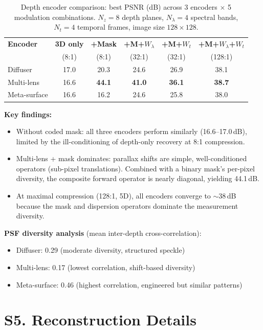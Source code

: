 \documentclass[11pt,a4paper]{article}
\begin{document}
\begin{table}[htbp]
\centering
\caption{Depth encoder comparison: best PSNR (dB) across 3 encoders $\times$ 5 modulation combinations.  $N_z{=}8$ depth planes, $N_\lambda{=}4$ spectral bands, $N_t{=}4$ temporal frames, image size $128{\times}128$.}
\small
\begin{tabular}{@{}lccccc@{}}
\toprule
\textbf{Encoder} & \textbf{3D only} & \textbf{+Mask} & \textbf{+M+$W_\lambda$} & \textbf{+M+$W_t$} & \textbf{+M+$W_\lambda$+$W_t$} \\
& (8:1) & (8:1) & (32:1) & (32:1) & (128:1) \\
\midrule
Diffuser & 17.0 & 20.3 & 24.6 & 26.9 & 38.1 \\
Multi-lens & 16.6 & \textbf{44.1} & \textbf{41.0} & \textbf{36.1} & \textbf{38.7} \\
Meta-surface & 16.6 & 16.2 & 24.6 & 25.8 & 38.0 \\
\bottomrule
\end{tabular}
\end{table}

\textbf{Key findings:}
\begin{itemize}[nosep]
\item Without coded mask: all three encoders perform similarly (16.6--17.0\,dB), limited by the ill-conditioning of depth-only recovery at 8:1 compression.
\item Multi-lens + mask dominates: parallax shifts are simple, well-conditioned operators (sub-pixel translations).  Combined with a binary mask's per-pixel diversity, the composite forward operator is nearly diagonal, yielding 44.1\,dB.
\item At maximal compression (128:1, 5D), all encoders converge to ${\sim}$38\,dB because the mask and dispersion operators dominate the measurement diversity.
\end{itemize}

\textbf{PSF diversity analysis} (mean inter-depth cross-correlation):
\begin{itemize}[nosep]
\item Diffuser: 0.29 (moderate diversity, structured speckle)
\item Multi-lens: 0.17 (lowest correlation, shift-based diversity)
\item Meta-surface: 0.46 (highest correlation, engineered but similar patterns)
\end{itemize}

\section{S5. Reconstruction Details}
\end{document}
